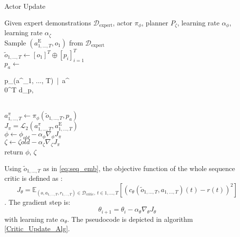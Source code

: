 \begin{algorithm}
    \caption{Actor Update}
    \label{Actor_Update_Alg}
    \begin{algorithmic}
    \Require Given expert demonstrations $\mathcal{D}_{\text{expert}}$, actor $\pi_{\phi}$, planner $P_{\zeta}$, 
    learning rate $\alpha_{\phi}$, learning rate $\alpha_{\zeta}$\\
    \State Sample $(a^{\text{E}}_{1, ..., T}, o_1)$ from $\mathcal{D}_{\text{expert}}$\\
    \State $\tilde{o}_{1, ..., T} \gets [o_1]^T \oplus [p_i]_{i=1}^T$ \hfill{} \\
    \State $p_a \gets $
    \begin{cases}
        p_{\zeta}(a^{}_{1, ..., T})\ |\ a^{} \notin {}\\
        0^{T \times d_p}, 
    \end{cases} \hfill{} \\
    \State $a^\pi_{1,...,T} \gets \pi_{\phi}(\tilde{o}_{1, ..., T}, p_a)$ \hfill{} \\
    \State $J_{\pi} = \mathcal{L}_2(a^\pi_{1,...,T}, a^{\text{E}}_{1, ..., T})$ \hfill{} \\
    \State $\phi \gets \phi_{old} - \alpha_{\phi} \nabla_{\phi}J_{\pi}$\\
    $\zeta \gets \zeta{old} - \alpha_{\zeta} \nabla_{\zeta}J_{\pi}$ \hfill{} \\
    \State return $\phi$, $\zeta$
\end{algorithmic}
\end{algorithm}
Using $\tilde{o}_{1, ..., T}$ as in \ref{eq:seq_emb}, the objective function of the whole sequence critic is defined as :
\begin{equation}
    J_{\theta} = \mathbb{E}_{(o, a_{1,...,T}, r_{1,...,T}) \in \mathcal{D}_{\text{critic}},\ t \in {1, ..., T}}\left[(c_{\theta}(\tilde{o}_{1, ..., T}, a_{1,...,T})(t) - r(t))^2\right]
\end{equation}
. The gradient step is:
\begin{equation*}
    \theta_{i+1} = \theta_i - \alpha_{\theta} \nabla_{\theta}J_{\theta}
\end{equation*}
with learning rate $\alpha_{\theta}$. The pseudocode is depicted in algorithm \ref{Critic_Update_Alg}.
